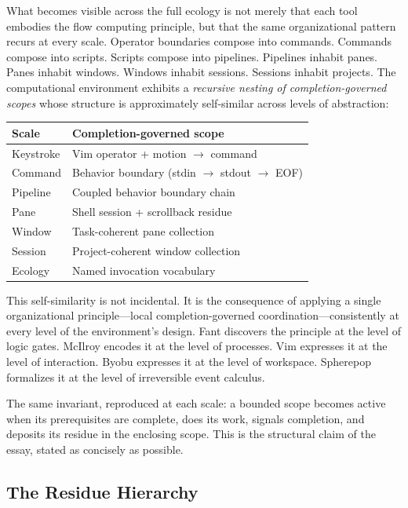 \documentclass[12pt, a4paper]{article}
\begin{document}
What becomes visible across the full ecology is not merely
that each tool embodies the flow computing principle, but that
the same organizational pattern recurs at every scale. Operator
boundaries compose into commands. Commands compose into scripts.
Scripts compose into pipelines. Pipelines inhabit panes. Panes
inhabit windows. Windows inhabit sessions. Sessions inhabit
projects. The computational environment exhibits a
\emph{recursive nesting of completion-governed scopes} whose
structure is approximately self-similar across levels of
abstraction:

\begin{center}
\begin{tabular}{ll}
\textbf{Scale} & \textbf{Completion-governed scope} \\
\hline
Keystroke & Vim operator + motion $\to$ command \\
Command & Behavior boundary (stdin $\to$ stdout $\to$ EOF) \\
Pipeline & Coupled behavior boundary chain \\
Pane & Shell session + scrollback residue \\
Window & Task-coherent pane collection \\
Session & Project-coherent window collection \\
Ecology & Named invocation vocabulary \\
\end{tabular}
\end{center}

This self-similarity is not incidental. It is the consequence
of applying a single organizational principle---local
completion-governed coordination---consistently at every level
of the environment's design. Fant discovers the principle at
the level of logic gates. McIlroy encodes it at the level of
processes. Vim expresses it at the level of interaction. Byobu
expresses it at the level of workspace. Spherepop formalizes
it at the level of irreversible event calculus.

The same invariant, reproduced at each scale: a bounded scope
becomes active when its prerequisites are complete, does its
work, signals completion, and deposits its residue in the
enclosing scope. This is the structural claim of the essay,
stated as concisely as possible.

\subsection{The Residue Hierarchy}
\end{document}
